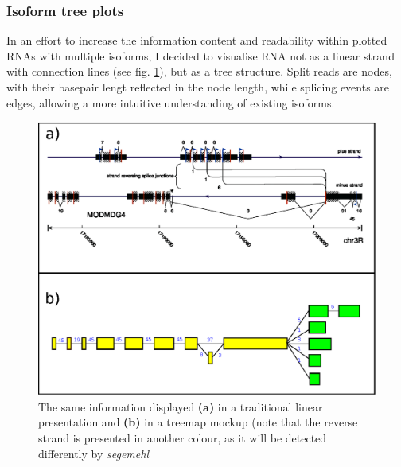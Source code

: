 \documentclass[11pt]{article}
\begin{document}
\subsubsection{Isoform tree plots}
\label{sec-2-2-1}
\label{txt:tree1}

In an effort to increase the information content and readability within plotted RNAs with
multiple isoforms, I decided to visualise RNA not as a linear strand with connection lines (see
fig. \ref{fig:linearrna}), but as a tree structure. Split reads are nodes, with their basepair
lengt reflected in the node length, while splicing events are edges, allowing a more
intuitive understanding of existing isoforms.


\begin{figure}[htb]
\centering
\includegraphics[width=.9\linewidth]{./rnas.eps}
\caption[Tree-like RNA visualisation]{The same information displayed \textbf{(a)} in a traditional linear presentation and \textbf{(b)} in a treemap mockup (note that the reverse strand is presented in another colour, as it will be detected differently by \textit{segemehl}}\label{fig:linearrna}
\end{figure}

\end{document}
